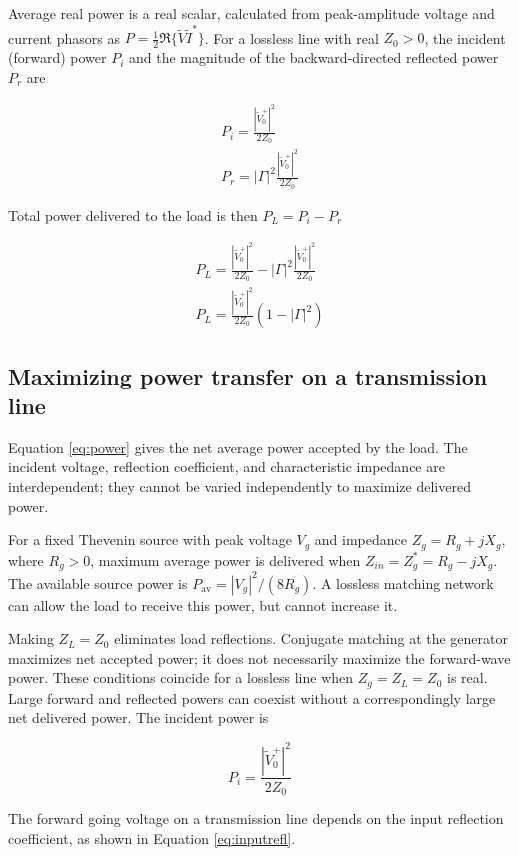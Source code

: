 \documentclass{ximera}
\begin{document}
Average real power is a real scalar, calculated from peak-amplitude voltage and current phasors as $P=\frac{1}{2}\Re\{\tilde{V}\tilde{I}^*\}$. For a lossless line with real $Z_0>0$, the incident (forward) power $P_i$ and the magnitude of the backward-directed reflected power $P_r$ are

\begin{eqnarray}
P_i=\frac{|\tilde{V}_0^+|^2}{2 Z_0} \\
P_r= |\Gamma|^2 \frac{|\tilde{V}_0^+|^2}{2 Z_0}
\end{eqnarray}

Total power delivered to the load is then  $P_L=P_i-P_r$

\begin{eqnarray}
P_L=\frac{|\tilde{V}_0^+|^2}{2 Z_0} - |\Gamma|^2 \frac{|\tilde{V}_0^+|^2}{2 Z_0} \\
P_L=\frac{|\tilde{V}_0^+|^2}{2 Z_0} (1-|\Gamma|^2 ) \label{eq:power}
\end{eqnarray}


\subsection{Maximizing power transfer on a transmission line}

Equation \ref{eq:power} gives the net average power accepted by the load. The incident voltage, reflection coefficient, and characteristic impedance are interdependent; they cannot be varied independently to maximize delivered power.

For a fixed Thevenin source with peak voltage $V_g$ and impedance $Z_g=R_g+jX_g$, where $R_g>0$, maximum average power is delivered when $Z_{in}=Z_g^*=R_g-jX_g$. The available source power is $P_{\mathrm{av}}=|V_g|^2/(8R_g)$. A lossless matching network can allow the load to receive this power, but cannot increase it.

Making $Z_L=Z_0$ eliminates load reflections. Conjugate matching at the generator maximizes net accepted power; it does not necessarily maximize the forward-wave power. These conditions coincide for a lossless line when $Z_g=Z_L=Z_0$ is real. Large forward and reflected powers can coexist without a correspondingly large net delivered power. The incident power is

\begin{equation}
P_i=\frac{|\tilde{V}_0^+|^2}{2 Z_0}
\end{equation}


The forward going voltage on a transmission line depends on the input reflection coefficient, as shown in Equation \ref{eq:inputrefl}.
\end{document}
